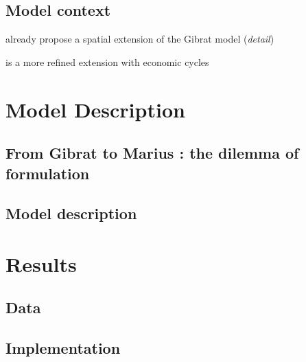 \subsection{Model context}

\cite{bretagnolle2000long} already propose a spatial extension of the Gibrat model (\textit{detail})

\cite{favaro2011gibrat} is a more refined extension with economic cycles



\section{Model Description}

\subsection{From Gibrat to Marius : the dilemma of formulation}






\subsection{Model description}






\section{Results}

\subsection{Data}



\subsection{Implementation}


